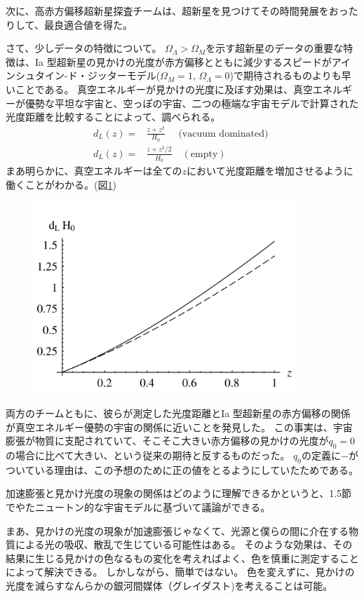 \documentclass[11pt]{ltjsarticle}
\theoremstyle{plain}
\theoremstyle{break}
\begin{document}
次に、高赤方偏移超新星探査チームは、超新星を見つけてその時間発展をおったりして、最良適合値を得た。

さて、少しデータの特徴について。
$\Omega_{\Lambda} > \Omega_{M}$を示す超新星のデータの重要な特徴は、Ia 型超新星の見かけの光度が赤方偏移とともに減少するスピードがアインシュタイン-ド・ジッターモデル($\Omega_{M}=1 , \, \Omega_{\Lambda}  = 0$)で期待されるものよりも早いことである。
真空エネルギーが見かけの光度に及ぼす効果は、真空エネルギーが優勢な平坦な宇宙と、空っぽの宇宙、二つの極端な宇宙モデルで計算された光度距離を比較することによって、調べられる。
\begin{align}
  d_{L}(z)=&\frac{z+z^{2}}{H_{0}} \quad \text { (vacuum dominated) } \\
  d_{L}(z)=&\frac{z+z^{2} / 2}{H_{0}} \quad(\text {empty})
\end{align}%
まあ明らかに、真空エネルギーは全ての$z$において光度距離を増加させるように働くことがわかる。(図\ref{fig:1-3})
\begin{figure}[h]
	\centering
	\includegraphics[width=10cm]{figure/fig1-3}
	\label{fig:1-3}
	\caption{}
\end{figure}%

両方のチームともに、彼らが測定した光度距離とIa 型超新星の赤方偏移の関係が真空エネルギー優勢の宇宙の関係に近いことを発見した。
この事実は、宇宙膨張が物質に支配されていて、そこそこ大きい赤方偏移の見かけの光度が$q_0=0$の場合に比べて大きい、という従来の期待と反するものだった。
$q_0$の定義に$-$がついている理由は、この予想のために正の値をとるようにしていたためである。

加速膨張と見かけ光度の現象の関係はどのように理解できるかというと、1.5節でやたニュートン的な宇宙モデルに基づいて議論ができる。

まあ、見かけの光度の現象が加速膨張じゃなくて、光源と僕らの間に介在する物質による光の吸収、散乱で生じている可能性はある。
そのような効果は、その結果に生じる見かけの色なるもの変化を考えればよく、色を慎重に測定することによって解決できる。
しかしながら、簡単ではない。
色を変えずに、見かけの光度を減らすなんらかの銀河間媒体（グレイダスト)を考えることは可能。
\end{document}
